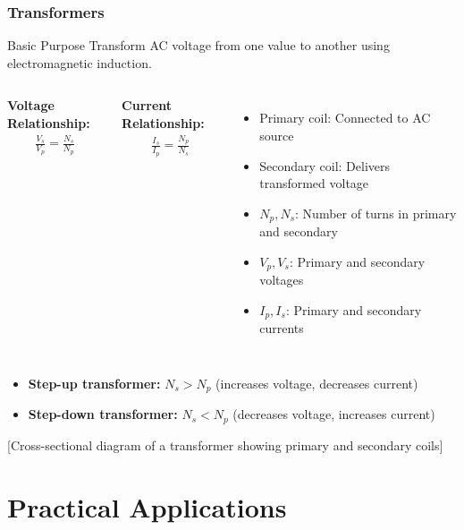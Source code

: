 \documentclass{beamer}
\begin{document}
\begin{frame}
\frametitle{Transformers}
\begin{block}{Basic Purpose}
Transform AC voltage from one value to another using electromagnetic induction.
\end{block}

\begin{columns}
\textbf{Voltage Relationship:}
\begin{align}
\frac{V_s}{V_p} = \frac{N_s}{N_p}
\end{align}

\textbf{Current Relationship:}
\begin{align}
\frac{I_s}{I_p} = \frac{N_p}{N_s}
\end{align}

\begin{itemize}
\item Primary coil: Connected to AC source
\item Secondary coil: Delivers transformed voltage
\item $N_p, N_s$: Number of turns in primary and secondary
\item $V_p, V_s$: Primary and secondary voltages
\item $I_p, I_s$: Primary and secondary currents
\end{itemize}
\end{columns}

\begin{itemize}
\item \textbf{Step-up transformer:} $N_s > N_p$ (increases voltage, decreases current)
\item \textbf{Step-down transformer:} $N_s < N_p$ (decreases voltage, increases current)
\end{itemize}

\alert{[Cross-sectional diagram of a transformer showing primary and secondary coils]}
\end{frame}

\section{Practical Applications}
\end{document}
